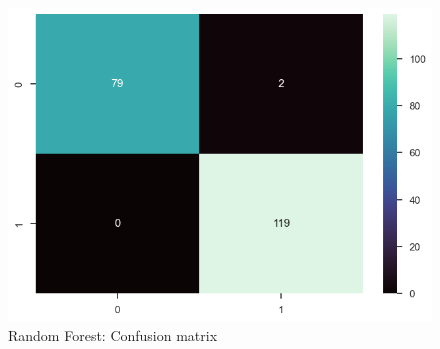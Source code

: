 \begin{figure}[h]
    \caption{Random Forest: Confusion matrix}\label{confusion-matrix-random-forest}
    \centering
    \includegraphics[width=\linewidth]{media/prediction-03-forest.png}
\end{figure}
